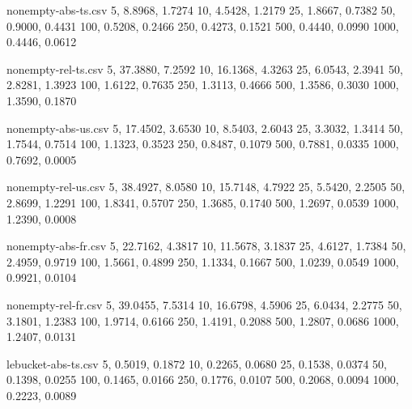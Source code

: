 

\begin{filecontents*}[overwrite]{nonempty-abs-ts.csv}
5,     8.8968,  1.7274
10,    4.5428,  1.2179
25,    1.8667,  0.7382
50,    0.9000,  0.4431
100,   0.5208,  0.2466
250,   0.4273,  0.1521
500,   0.4440,  0.0990
1000,  0.4446,  0.0612
\end{filecontents*}

\begin{filecontents*}[overwrite]{nonempty-rel-ts.csv}
5,    37.3880, 7.2592
10,   16.1368, 4.3263
25,    6.0543, 2.3941
50,    2.8281, 1.3923
100,   1.6122, 0.7635
250,   1.3113, 0.4666
500,   1.3586, 0.3030
1000,  1.3590, 0.1870
\end{filecontents*}

\begin{filecontents*}[overwrite]{nonempty-abs-us.csv}
5,    17.4502, 3.6530
10,    8.5403, 2.6043
25,    3.3032, 1.3414
50,    1.7544, 0.7514
100,   1.1323, 0.3523
250,   0.8487, 0.1079
500,   0.7881, 0.0335
1000,  0.7692, 0.0005
\end{filecontents*}

\begin{filecontents*}[overwrite]{nonempty-rel-us.csv}
5,    38.4927, 8.0580
10,   15.7148, 4.7922
25,    5.5420, 2.2505
50,    2.8699, 1.2291
100,   1.8341, 0.5707
250,   1.3685, 0.1740
500,   1.2697, 0.0539
1000,  1.2390, 0.0008
\end{filecontents*}

\begin{filecontents*}[overwrite]{nonempty-abs-fr.csv}
5,    22.7162, 4.3817
10,   11.5678, 3.1837
25,    4.6127, 1.7384
50,    2.4959, 0.9719
100,   1.5661, 0.4899
250,   1.1334, 0.1667
500,   1.0239, 0.0549
1000,  0.9921, 0.0104
\end{filecontents*}

\begin{filecontents*}[overwrite]{nonempty-rel-fr.csv}
5,    39.0455, 7.5314
10,   16.6798, 4.5906
25,    6.0434, 2.2775
50,    3.1801, 1.2383
100,   1.9714, 0.6166
250,   1.4191, 0.2088
500,   1.2807, 0.0686
1000,  1.2407, 0.0131
\end{filecontents*}


\begin{filecontents*}[overwrite]{lebucket-abs-ts.csv}
5,    0.5019, 0.1872
10,   0.2265, 0.0680
25,   0.1538, 0.0374
50,   0.1398, 0.0255
100,  0.1465, 0.0166
250,  0.1776, 0.0107
500,  0.2068, 0.0094
1000, 0.2223, 0.0089
\end{filecontents*}

